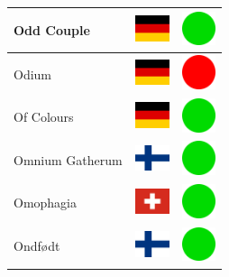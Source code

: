\documentclass[12pt, a4paper, twoside]{report}
\begin{document}
\begin{center}
\begin{longtable}{|p{5cm}|p{2cm}|p{2cm}|}
 Odd Couple                                                 & \includegraphics[width=1cm]{../img/flags/de} &   \includegraphics[width=1cm]{../likes/y} \\ \hline
 Odium                                                      & \includegraphics[width=1cm]{../img/flags/de} &   \includegraphics[width=1cm]{../likes/n} \\ \hline
 Of Colours                                                 & \includegraphics[width=1cm]{../img/flags/de} &   \includegraphics[width=1cm]{../likes/y} \\ \hline
 Omnium Gatherum                                            & \includegraphics[width=1cm]{../img/flags/fi} &   \includegraphics[width=1cm]{../likes/y} \\ \hline
 Omophagia                                                  & \includegraphics[width=1cm]{../img/flags/ch} &   \includegraphics[width=1cm]{../likes/y} \\ \hline
 Ondfødt                                                    & \includegraphics[width=1cm]{../img/flags/fi} &   \includegraphics[width=1cm]{../likes/y} \\ \hline

\end{longtable}
\end{center}
\end{document}

